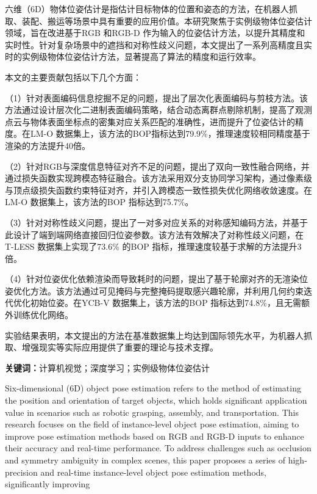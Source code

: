 \cleardoublepage
{}
\par 六维（6D）物体位姿估计是指估计目标物体的位置和姿态的方法，在机器人抓取、装配、搬运等场景中具有重要的应用价值。本研究聚焦于实例级物体位姿估计领域，旨在改进基于RGB 和RGB-D 作为输入的位姿估计方法，以提升其精度和实时性。针对复杂场景中的遮挡和对称性歧义问题，本文提出了一系列高精度且实时的实例级物体位姿估计方法，显著提高了算法的精度和运行效率。
\par 本文的主要贡献包括以下几个方面：
\par （1）针对表面编码信息挖掘不足的问题，提出了层次化表面编码与剪枝方法。该方法通过设计层次化二进制表面编码策略，结合动态离群点剔除机制，提高了观测点云与物体表面坐标点的密集对应关系匹配的准确性，进而提升了位姿估计的精度。在LM-O 数据集上，该方法的BOP指标达到79.9\%，推理速度较相同精度基于渲染的方法提升40倍。
\par （2）针对RGB与深度信息特征对齐不足的问题，提出了双向一致性融合网络，并通过损失函数实现跨模态特征融合。该方法采用双分支协同学习架构，通过像素级与顶点级损失函数约束特征对齐，并引入跨模态一致性损失优化网络收敛速度。在LM-O 数据集上，该方法的BOP 指标达到75.7\%。
\par （3）针对对称性歧义问题，提出了一对多对应关系的对称感知编码方法，并基于此设计了端到端网络直接回归位姿参数。该方法有效解决了对称性歧义问题，在T-LESS 数据集上实现了73.6\% 的BOP 指标，推理速度较基于求解的方法提升3倍。
\par （4）针对位姿优化依赖渲染而导致耗时的问题，提出了基于轮廓对齐的无渲染位姿优化方法。该方法通过可见掩码与完整掩码提取感兴趣轮廓，并利用几何约束迭代优化初始位姿。在YCB-V 数据集上，该方法的BOP 指标达到74.8\%，且无需额外训练优化网络。
\par 实验结果表明，本文提出的方法在基准数据集上均达到国际领先水平，为机器人抓取、增强现实等实际应用提供了重要的理论与技术支撑。
\par \textbf{关键词：}计算机视觉；深度学习；实例级物体位姿估计
\cleardoublepage
{}
\par Six-dimensional (6D) object pose estimation refers to the method of estimating the position and orientation of target objects, which holds significant application value in scenarios such as robotic grasping, assembly, and transportation. This research focuses on the field of instance-level object pose estimation, aiming to improve pose estimation methods based on RGB and RGB-D inputs to enhance their accuracy and real-time performance. To address challenges such as occlusion and symmetry ambiguity in complex scenes, this paper proposes a series of high-precision and real-time instance-level object pose estimation methods, significantly improving
